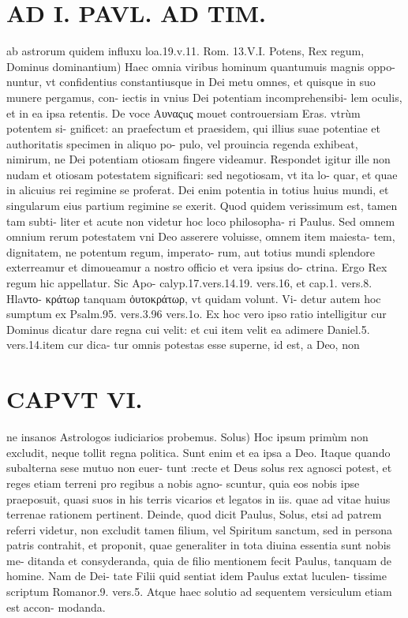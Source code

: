 \documentclass{article}
\begin{document}
\begin{pages}
\section*{AD I. PAVL. AD TIM. }
\marginpar{[ p.402 ]}\pstart ab astrorum quidem influxu loa.19.v.11. Rom. 13.V.I.  \pend\pstart Potens, Rex regum, Dominus dominantium) Haec omnia viribus hominum quantumuis magnis oppo- nuntur, vt confidentius constantiusque  in Dei metu omnes, et quisque in suo munere pergamus, con- iectis in vnius Dei potentiam incomprehensibi- lem oculis, et in ea ipsa retentis. De voce Aυναςuς mouet controuersiam Eras. vtrùm potentem si- gnificet: an praefectum et praesidem, qui illius suae potentiae et authoritatis specimen in aliquo po- pulo, vel prouincia regenda exhibeat, nimirum, ne Dei potentiam otiosam fingere videamur. Respondet igitur ille non nudam et otiosam potestatem significari: sed negotiosam, vt ita lo- quar, et quae in alicuius rei regimine se proferat. Dei enim potentia in totius huius mundi, et singularum eius partium regimine se exerit. Quod quidem verissimum est, tamen tam subti- liter et acute non videtur hoc loco philosopha- ri Paulus. Sed omnem omnium rerum potestatem vni Deo asserere voluisse, omnem item maiesta- tem, dignitatem, ne potentum regum, imperato- rum, aut totius mundi splendore exterreamur et dimoueamur a nostro officio et vera ipsius do- ctrina. Ergo Rex regum hic appellatur. Sic Apo- calyp.17.vers.14.19. vers.16, et cap.1. vers.8. Hlaντο- κράτωρ tanquam ὀυτοκράτωρ, vt quidam volunt. Vi- detur autem hoc sumptum ex Psalm.95. vers.3.96 vers.1o. Ex hoc vero ipso ratio intelligitur cur Dominus dicatur dare regna cui velit: et cui item velit ea adimere Daniel.5. vers.14.item cur dica- tur omnis potestas esse superne, id est, a Deo, non  \pend
\section*{CAPVT  VI. }
\marginpar{[ p.483 ]}\pstart ne insanos Astrologos iudiciarios probemus.  \pend\pstart Solus) Hoc ipsum primùm non excludit, neque  tollit regna politica. Sunt enim et ea ipsa a Deo. Itaque quando subalterna sese mutuo non euer- tunt :recte et Deus solus rex agnosci potest, et reges etiam terreni pro regibus a nobis agno- scuntur, quia eos nobis ipse praeposuit, quasi suos in his terris vicarios et legatos in iis. quae ad vitae huius terrenae rationem pertinent. Deinde, quod dicit Paulus, Solus, etsi ad patrem referri videtur, non excludit tamen filium, vel Spiritum sanctum, sed in persona patris contrahit, et proponit, quae generaliter in tota diuina essentia sunt nobis me- ditanda et consyderanda, quia de filio mentionem fecit Paulus, tanquam de homine. Nam de Dei- tate Filii quid sentiat idem Paulus extat luculen- tissime scriptum Romanor.9. vers.5. Atque haec solutio ad sequentem versiculum etiam est accon- modanda.  \pend
{}
{}

\end{pages}
\end{document}
